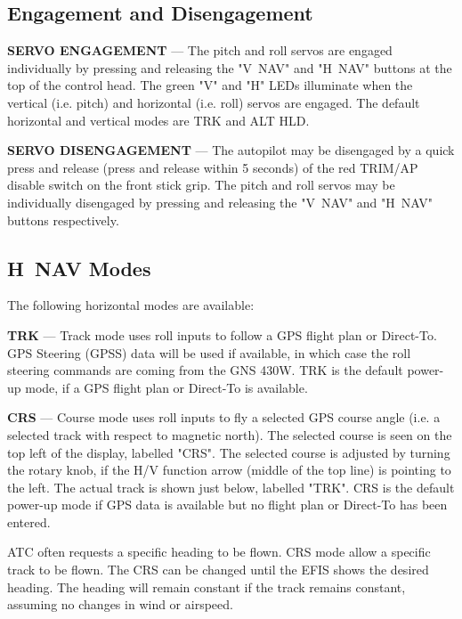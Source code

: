 \subsection*{Engagement and Disengagement}

\textbf{SERVO ENGAGEMENT} --- The pitch and roll servos are engaged individually by pressing and releasing the "V~NAV" and "H~NAV" buttons at the top of the control head. The green "V" and "H" LEDs illuminate when the vertical (i.e. pitch) and horizontal (i.e. roll) servos are engaged. The default horizontal and vertical modes are TRK and ALT HLD.

\textbf{SERVO DISENGAGEMENT} --- The autopilot may be disengaged by a quick press and release (press and release within 5 seconds) of the red TRIM/AP disable switch on the front stick grip. The pitch and roll servos may be individually disengaged by pressing and releasing the "V~NAV" and "H~NAV" buttons respectively. %

\subsection*{H~NAV Modes}
The following horizontal modes are available:

\textbf{TRK} --- Track mode uses roll inputs to follow a GPS flight plan or Direct-To. GPS Steering (GPSS) data will be used if available, in which case the roll steering commands are coming from the GNS 430W. TRK is the default power-up mode, if a GPS flight plan or Direct-To is available.

\textbf{CRS} --- Course mode uses roll inputs to fly a selected GPS course angle (i.e. a selected track with respect to magnetic north). The selected course is seen on the top left of the display, labelled "CRS". The selected course is adjusted by turning the rotary knob, if the H/V function arrow (middle of the top line) is pointing to the left. The actual track is shown just below, labelled "TRK". CRS is the default power-up mode if GPS data is available but no flight plan or Direct-To has been entered.

\begin{Note}
ATC often requests a specific heading to be flown. CRS mode allow a specific track to be flown. The CRS can be changed until the EFIS shows the desired heading. The heading will remain constant if the track remains constant, assuming no changes in wind or airspeed.
\end{Note}

